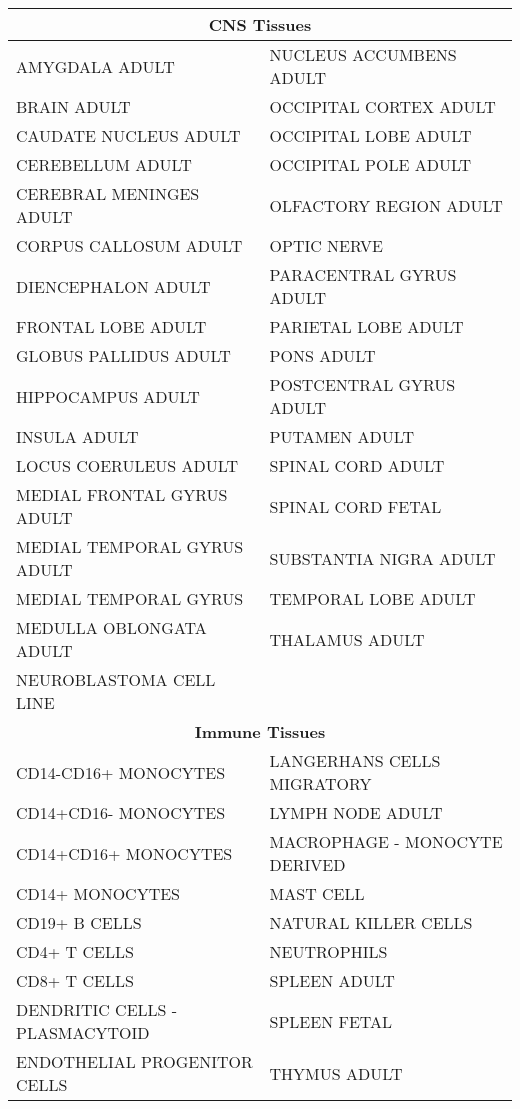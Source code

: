 \begin{table}[ht]
\centering
\begin{tabular}{|l|l|}
	\hline
	\multicolumn{2}{|c|}{\bf CNS Tissues} \\
  \hline
  \hline
  AMYGDALA ADULT & NUCLEUS ACCUMBENS ADULT \\ 
  BRAIN ADULT & OCCIPITAL CORTEX ADULT \\ 
  CAUDATE NUCLEUS ADULT & OCCIPITAL LOBE ADULT \\ 
  CEREBELLUM ADULT & OCCIPITAL POLE ADULT \\ 
  CEREBRAL MENINGES ADULT & OLFACTORY REGION ADULT \\ 
  CORPUS CALLOSUM ADULT & OPTIC NERVE \\ 
  DIENCEPHALON ADULT & PARACENTRAL GYRUS ADULT \\ 
  FRONTAL LOBE ADULT & PARIETAL LOBE ADULT \\ 
  GLOBUS PALLIDUS ADULT & PONS ADULT \\ 
  HIPPOCAMPUS ADULT & POSTCENTRAL GYRUS ADULT \\ 
  INSULA ADULT & PUTAMEN ADULT \\ 
  LOCUS COERULEUS ADULT & SPINAL CORD ADULT \\ 
  MEDIAL FRONTAL GYRUS ADULT & SPINAL CORD FETAL \\ 
  MEDIAL TEMPORAL GYRUS ADULT & SUBSTANTIA NIGRA ADULT \\ 
  MEDIAL TEMPORAL GYRUS & TEMPORAL LOBE ADULT \\ 
  MEDULLA OBLONGATA ADULT & THALAMUS ADULT \\ 
  NEUROBLASTOMA CELL LINE &  \\ 
   \hline
   	\hline
	\multicolumn{2}{|c|}{\bf Immune Tissues} \\
  \hline
  \hline
  CD14-CD16+ MONOCYTES & LANGERHANS CELLS MIGRATORY \\ 
  CD14+CD16- MONOCYTES & LYMPH NODE ADULT \\ 
  CD14+CD16+ MONOCYTES & MACROPHAGE - MONOCYTE DERIVED \\ 
  CD14+ MONOCYTES & MAST CELL \\ 
  CD19+ B CELLS & NATURAL KILLER CELLS \\ 
  CD4+ T CELLS & NEUTROPHILS \\ 
  CD8+ T CELLS & SPLEEN ADULT \\ 
  DENDRITIC CELLS - PLASMACYTOID & SPLEEN FETAL \\ 
  ENDOTHELIAL PROGENITOR CELLS & THYMUS ADULT \\ 

\end{tabular}
\end{table}
